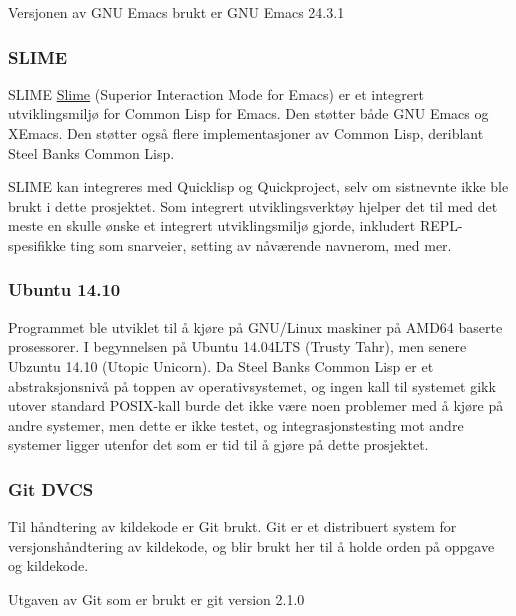 \documentclass[11pt]{article}
\begin{document}
Versjonen av GNU Emacs brukt er GNU Emacs 24.3.1



\subsubsection{SLIME}



SLIME \href{(https://common-lisp.net/project/slime/}{Slime} (Superior Interaction Mode for Emacs) er et integrert utviklingsmiljø for Common Lisp for Emacs. Den støtter både GNU Emacs og XEmacs. Den støtter også flere implementasjoner av Common Lisp, deriblant Steel Banks Common Lisp.



SLIME kan integreres med Quicklisp og Quickproject, selv om sistnevnte ikke ble brukt i dette prosjektet.
Som integrert utviklingsverktøy hjelper det til med det meste en skulle ønske et integrert utviklingsmiljø gjorde, inkludert REPL-spesifikke ting som snarveier, setting av nåværende navnerom, med mer.



\subsubsection{Ubuntu 14.10}



Programmet ble utviklet til å kjøre på GNU/Linux maskiner på AMD64 baserte prosessorer. I begynnelsen på Ubuntu 14.04LTS (Trusty Tahr), men senere Ubzuntu 14.10 (Utopic Unicorn). Da Steel Banks Common Lisp er et abstraksjonsnivå på toppen av operativsystemet, og ingen kall til systemet gikk utover standard POSIX-kall burde det ikke være noen problemer med å kjøre på andre systemer, men dette er ikke testet, og integrasjonstesting mot andre systemer ligger utenfor det som er tid til å gjøre på dette prosjektet.



\subsubsection{Git DVCS}



Til håndtering av kildekode er Git brukt.
Git er et distribuert system for versjonshåndtering av kildekode, og blir brukt her til å holde orden på oppgave og kildekode.



Utgaven av Git som er brukt er git version 2.1.0
\end{document}
